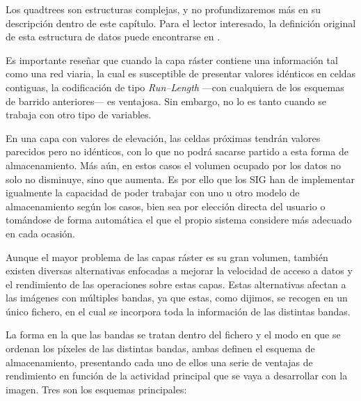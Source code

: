 \begin{multicols}{2}
Los quadtrees son estructuras complejas, y no profundizaremos más en su descripción dentro de este capítulo. Para el lector interesado, la definición original de esta estructura de datos puede encontrarse en \cite{Finkel1974Acta}. 

Es importante reseñar que cuando la capa ráster contiene una información tal como una red viaria, la cual es susceptible de presentar valores idénticos en celdas contiguas, la codificación de tipo \emph{Run--Length} ---con cualquiera de los esquemas de barrido anteriores--- es ventajosa. Sin embargo, no lo es tanto cuando se trabaja con otro tipo de variables. 

En una capa con valores de elevación, las celdas próximas tendrán valores parecidos pero no idénticos, con lo que no podrá sacarse partido a esta forma de almacenamiento. Más aún, en estos casos el volumen ocupado por los datos no solo no disminuye, sino que aumenta. Es por ello que los SIG han de implementar igualmente la capacidad de poder trabajar con uno u otro modelo de almacenamiento según los casos, bien sea por elección directa del usuario o tomándose de forma automática el que el propio sistema considere más adecuado en cada ocasión.

Aunque el mayor problema de las capas ráster es su gran volumen, también existen diversas alternativas enfocadas a mejorar la velocidad de acceso a datos y el rendimiento de las operaciones sobre estas capas. Estas alternativas afectan a las imágenes con múltiples bandas, ya que estas, como dijimos, se recogen en un único fichero, en el cual se incorpora toda la información de las distintas bandas.

La forma en la que las bandas se tratan dentro del fichero y el modo en que se ordenan los píxeles de las distintas bandas, ambas definen el esquema de almacenamiento, presentando cada uno de ellos una serie de ventajas de rendimiento en función de la actividad principal que se vaya a desarrollar con la imagen. Tres son los esquemas principales:



\end{multicols}
